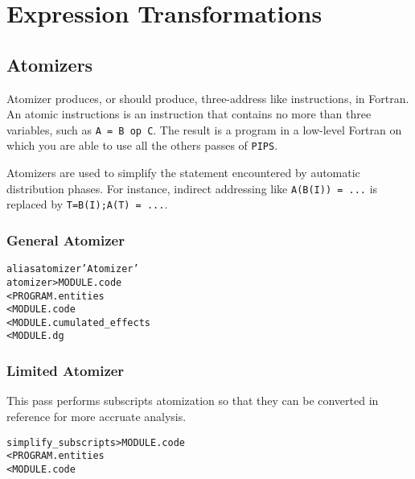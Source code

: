 \documentclass[a4paper]{report}
\newenvironment{PipsMake}{\begin{alltt}}{\end{alltt}}
\newenvironment{PipsPass}[1]{\label{pass:#1}}{}
\newcommand{\Pips}{\texttt{PIPS}}
\begin{document}
\section{Expression Transformations}


\subsection{Atomizers}
\label{subsection-atomizers}

\begin{PipsPass}{atomizer}
Atomizer produces, or should produce, three-address like instructions,
in Fortran. An atomic instructions is an instruction that contains no
more than three variables, such as {\tt A = B op C}. The result is a
program in a low-level Fortran on which you are able to use all the
others passes of \Pips{}.

Atomizers are used to simplify the statement encountered by automatic
distribution phases. For instance, indirect addressing like
\verb/A(B(I)) = .../ is replaced by \verb/T=B(I);A(T) = .../.
\end{PipsPass}

\subsubsection{General Atomizer}

\begin{PipsMake}
alias atomizer 'Atomizer'
atomizer                      > MODULE.code
        < PROGRAM.entities
        < MODULE.code
        < MODULE.cumulated_effects
        < MODULE.dg
\end{PipsMake}

\subsubsection{Limited Atomizer}
\label{subsubsection:limited-atomizer}

\begin{PipsPass}{simplify_subscripts}
This pass performs subscripts atomization so that they can be converted in reference
for more accruate analysis.
\end{PipsPass}
\begin{PipsMake}
simplify_subscripts > MODULE.code
        < PROGRAM.entities
        < MODULE.code
\end{PipsMake}
\end{document}
